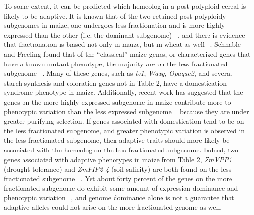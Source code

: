 \documentclass[12pt]{article}
\begin{document}
To some extent, it can be predicted which homeolog in a post-polyploid cereal is likely to be adaptive. It is known that of the two retained post-polyploidy subgenomes in maize, one undergoes less fractionation and is more highly expressed than the other (i.e. the dominant subgenome) ~\citep{Woodhouse2010, Schnable2011}, and there is evidence that fractionation is biased not only in maize, but in wheat as well ~\citep{Eckardt2014}.  Schnable and Freeling found that of the “classical” maize genes, or characterized genes that have a known mutant phenotype, the majority are on the less fractionated subgenome ~\citep{Schnable20112}. Many of these genes, such as \textit{tb1}, \textit{Waxy}, \textit{Opaque2}, and several starch synthesis and coloration genes not in Table 2, have a domestication syndrome phenotype in maize.  Additionally, recent work has suggested that the genes on the more highly expressed subgenome in maize contribute more to phenotypic variation than the less expressed subgenome ~\citep{RennyByfield2017} because they are under greater purifying selection.  If genes associated with domestication tend to be on the less fractionated subgenome, and greater phenotypic variation is observed in the less fractionated subgenome, then adaptive traits should more likely be associated with the homeolog on the less fractionated subgenome.  Indeed, two genes associated with adaptive phenotypes in maize from Table 2, \textit{ZmVPP1} (drought tolerance) and \textit{ZmPIP2-4} (soil salinity) are both found on the less fractionated subgenome ~\citep{Schnable20112}. Yet about forty percent of the genes on the more fractionated subgenome do exhibit some amount of expression dominance and phenotypic variation ~\citep{RennyByfield2017}, and genome dominance alone is not a guarantee that adaptive alleles could not arise on the more fractionated genome as well.  
\end{document}
